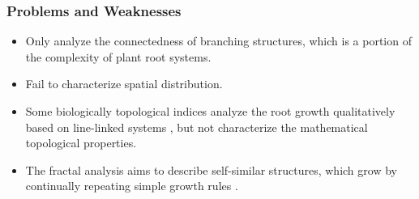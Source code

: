    \subsubsection{Problems and Weaknesses}
     \begin{itemize}  
       \item Only analyze the connectedness of branching structures, which is a portion of the complexity of plant root systems.
       \item Fail to characterize spatial distribution.
       \item Some biologically topological indices analyze the root growth qualitatively based on line-linked systems \cite{fitter1986topology}, but not characterize the mathematical topological properties.
       \item The fractal analysis aims to describe self-similar structures, which grow by continually repeating simple growth rules \cite{fitter1992fractal}.
     \end{itemize}
     

       
